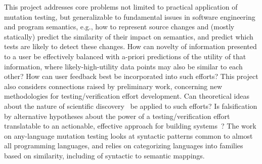 This project addresses core problems not limited to practical application of mutation testing, but generalizable to fundamental issues in software engineering and program semantics, e.g., how to represent source changes and (mostly statically) predict the similarity of their impact on semantics, and predict which tests are likely to detect these changes.  How can novelty of information presented to a user be effectively balanced with a-priori predictions of the utility of that information, where likely-high-utility data points may also be similar to each other?  How can user feedback best be incorporated into such efforts?  This project also considers connections raised by preliminary work, concerning new methodologies for testing/verification effort development.  Can theoretical ideas about the nature of scientific discovery~\cite{Popper,popperconjectures,lakatos} be applied to such efforts?  Is falsification by alternative hypotheses about the power of a testing/verification effort translatable to an actionable, effective approach for building systems~\cite{groce2015verified,groce2018verified}? 
The work on any-language mutation testing looks at syntactic patterns common to almost all programming languages, and relies on categorizing languages into families based on similarity, including of syntactic to semantic mappings.
